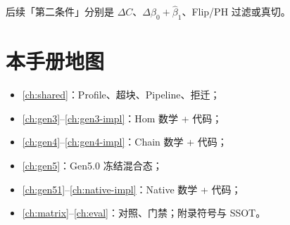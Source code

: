 后续「第二条件」分别是 $\Delta C$、$\Delta\hat\beta_0\!+\!\hat\beta_1$、Flip/PH 过滤或真切。

\section{本手册地图}

\begin{itemize}[nosep]
  \item \cref{ch:shared}：Profile、超块、Pipeline、拒迁；
  \item \cref{ch:gen3}--\cref{ch:gen3-impl}：Hom 数学 + 代码；
  \item \cref{ch:gen4}--\cref{ch:gen4-impl}：Chain 数学 + 代码；
  \item \cref{ch:gen5}：Gen5.0 冻结混合态；
  \item \cref{ch:gen51}--\cref{ch:native-impl}：Native 数学 + 代码；
  \item \cref{ch:matrix}--\cref{ch:eval}：对照、门禁；附录符号与 SSOT。
\end{itemize}
